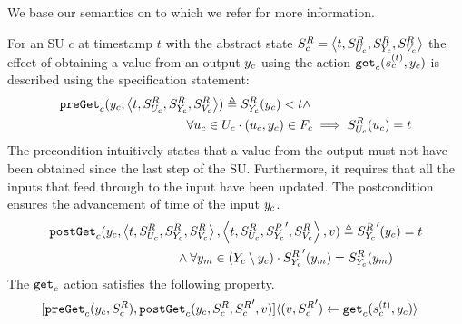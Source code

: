 We base our semantics on \cite{Gomes2019a,hansen_verification_2021} to which we refer for more information.

\begin{definition}\label{def:getout}  
  For an SU $c$ at timestamp $t$ with the abstract state $S^{R}_{c} =  \left\langle t,S^{R}_{U_{c}}, S^{R}_{Y_{c}}, S^{R}_{V_c} \right\rangle $ the effect of obtaining a value from an output $y_{c}$ using the action $\mathtt{get}_{c}(s_{c}^{(t)},y_{c})$ is described using the specification statement:
  \begin{align*}
    &\mathtt{preGet}_{c}(y_{c},  \left\langle t,S^{R}_{U_{c}}, S^{R}_{Y_{c}}, S^{R}_{V_c} \right\rangle ) \triangleq
    S^{R}_{Y_{c}}(y_{c}) < t \land \nonumber \\
    & \qquad \qquad \qquad \qquad \qquad 
    \forall u_{c} \in U_{c} \cdot (u_{c}, y_{c}) \in F_{c} 
    \implies S^{R}_{U_{c}}(u_{c}) = t 
  \end{align*}
  The precondition intuitively states that a value from the output must not have been obtained since the last step of the SU.
  Furthermore, it requires that all the inputs that feed through to the input have been updated.
  The postcondition ensures the advancement of time of the input $y_{c}$.
  \begin{align*}
    &\mathtt{postGet}_{c}(y_{c},  \left\langle t,S^{R}_{U_{c}}, S^{R}_{Y_{c}}, S^{R}_{V_c} \right\rangle , 
     \left\langle t,S^{R}_{U_{c}}, {S^{R}_{Y_{c}}}', S^{R}_{V_c} \right\rangle , v) \triangleq 
    {S^{R}_{Y_{c}}}'(y_{c}) = t \nonumber \\
    & \qquad \qquad \qquad \qquad \qquad 
    \land 
    \forall y_{m} \in (Y_{c} \setminus y_{c}) \cdot 
    {S^{R}_{Y_{c}}}'(y_{m}) =
    S^{R}_{Y_{c}}(y_{m})
  \end{align*}
  The $\mathtt{get}_{c}$ action satisfies the following property.
  \begin{align*}
    &[\mathtt{preGet}_{c}(y_{c}, S^{R}_{c}), 
    \mathtt{postGet}_{c}(y_{c}, S^{R}_{c}, {S^{R}_{c}}', v)] 
    \langle (v, {S^{R}_{c}}') \gets \mathtt{get}_{c}(s_{c}^{(t)},y_{c}) \rangle \nonumber
  \end{align*}
\end{definition}


